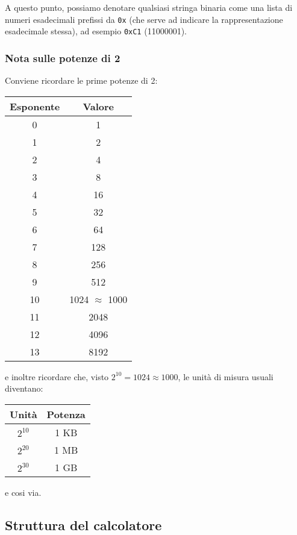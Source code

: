 \documentclass[a4paper,11pt]{article}
\begin{document}
A questo punto, possiamo denotare qualsiasi stringa binaria come una lista di numeri esadecimali prefissi da \texttt{0x} (che serve ad indicare la rappresentazione esadecimale stessa), ad esempio \texttt{0xC1} (11000001).

\subsubsection{Nota sulle potenze di 2}
Conviene ricordare le prime potenze di 2:

\begin{table}[H]
    \centering
    \begin{tabular}{ c | c  }
        \bfseries Esponente & \bfseries Valore \\
        \hline
				0 & 1 \\
				1 & 2 \\
				2 & 4 \\
				3 & 8 \\
				4 & 16 \\
				5 & 32 \\
				6 & 64 \\
				7 & 128 \\
				8 & 256 \\
				9 & 512 \\
				10 & 1024 $\approx$ 1000 \\
				11 & 2048 \\
				12 & 4096 \\
				13 & 8192 \\
    \end{tabular}
\end{table}

e inoltre ricordare che, visto $2^10 = 1024 \approx 1000$, le unità di misura usuali diventano:

\begin{table}[H]
    \centering
    \begin{tabular}{ c | c }
        \bfseries Unità & \bfseries Potenza \\
        \hline
				$2^{10}$ & 1 KB \\
				$2^{20}$ & 1 MB \\
				$2^{30}$ & 1 GB \\
    \end{tabular}
\end{table}

e cosi via.

\subsection{Struttura del calcolatore}
\end{document}
